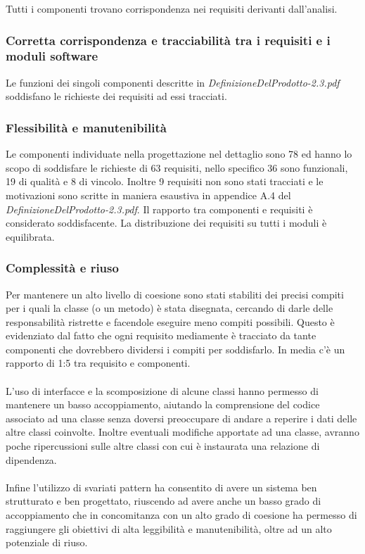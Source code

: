 Tutti i componenti trovano corrispondenza nei requisiti derivanti dall'analisi.

\subsubsection*{Corretta corrispondenza e tracciabilit\`a tra i requisiti e i
moduli software} 
Le funzioni dei singoli componenti descritte in
\emph{DefinizioneDelProdotto-2.3.pdf} soddisfano le richieste dei requisiti ad
essi tracciati.

\subsubsection*{Flessibilit\`a e manutenibilit\`a} Le componenti individuate
nella progettazione nel dettaglio sono 78 ed hanno lo scopo di soddisfare le
richieste di 63 requisiti, nello specifico 36 sono funzionali, 19 di qualit\`a e
8 di vincolo. Inoltre 9 requisiti non sono stati tracciati e le motivazioni sono
scritte in maniera esaustiva in appendice A.4 del
\emph{DefinizioneDelProdotto-2.3.pdf}. Il rapporto tra componenti e requisiti
\`e considerato soddisfacente. La distribuzione dei requisiti su tutti i moduli
\`e equilibrata.

\subsubsection*{Complessit\`a e riuso}
Per mantenere un alto livello di coesione sono stati stabiliti dei precisi
compiti per i quali la classe (o un metodo) \`e stata disegnata, cercando di
darle delle responsabilit\`a ristrette e facendole eseguire meno compiti
possibili. Questo \`e evidenziato dal fatto che ogni requisito mediamente \`e
tracciato da tante componenti che dovrebbero dividersi i compiti per
soddisfarlo. In media c'\`e un rapporto di 1:5 tra requisito e componenti. \\\\
L'uso di interfacce e la scomposizione di alcune classi hanno permesso di
mantenere un basso accoppiamento, aiutando la comprensione del codice associato
ad una classe senza doversi preoccupare di andare a reperire i dati delle altre
classi coinvolte. Inoltre eventuali modifiche apportate ad una classe, avranno
poche ripercussioni sulle altre classi con cui \`e instaurata una relazione di
dipendenza. \\\\
Infine l'utilizzo di svariati pattern ha consentito di avere un sistema ben
strutturato e ben progettato, riuscendo ad avere anche un basso grado di
accoppiamento che in concomitanza con un alto grado di coesione ha permesso di
raggiungere gli obiettivi di alta leggibilit\`a e manutenibilit\`a, oltre ad un
alto potenziale di riuso.

